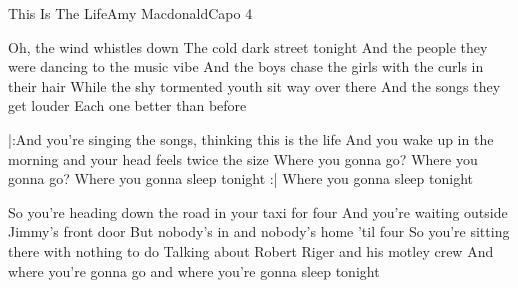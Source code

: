 \begin{song}{This Is The Life}{Amy Macdonald}{Capo 4}

Oh, the wind whistles down
The cold dark street tonight
And the people they were dancing to the music vibe
And the boys chase the girls with the curls in their hair
While the shy tormented youth sit way over there
And the songs they get louder
Each one better than before

|:And you're singing the songs, thinking this is the life
And you wake up in the morning and your head feels twice the size
Where you gonna go? Where you gonna go?
Where you gonna sleep tonight :|
Where you gonna sleep tonight

So you're heading down the road in your taxi for four
And you're waiting outside Jimmy's front door
But nobody's in and nobody's home 'til four
So you're sitting there with nothing to do
Talking about Robert Riger and his motley crew
And where you're gonna go and where you're gonna sleep tonight


\end{song}
